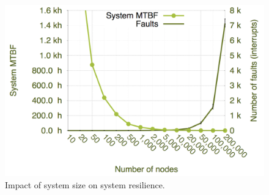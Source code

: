 \begin{figure}[!t]
	\begin{center}
		\includegraphics[width=0.9\columnwidth]{Figures/sandia_system_failure_rate_increase_nodes}
	\end{center}
	\caption{Impact of system size on system resilience.}
	\label{fig:exe_failure}
\end{figure}


